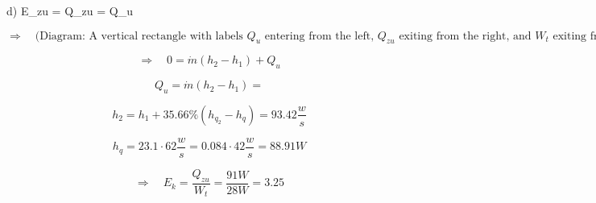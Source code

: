 d) \quad E_{zu} =  \quad Q_{zu} = Q_u

\[
\Rightarrow \quad \text{(Diagram: A vertical rectangle with labels $Q_u$ entering from the left, $Q_{zu}$ exiting from the right, and $W_t$ exiting from the bottom)}
\]

\[
\Rightarrow \quad 0 = \dot{m} (h_2 - h_1) + Q_u
\]

\[
Q_u = \dot{m} (h_2 - h_1) =
\]

\[
h_2 = h_1 + 35.66\% (h_{q_2} - h_q) = 93.42 \frac{w}{s}
\]

\[
h_q = 23.1 \cdot 62 \frac{w}{s} = 0.084 \cdot 42 \frac{w}{s} = 88.91 W
\]

\[
\Rightarrow \quad E_k = \frac{Q_{zu}}{W_t} = \frac{91 W}{28 W} = \boxed{3.25}
\]